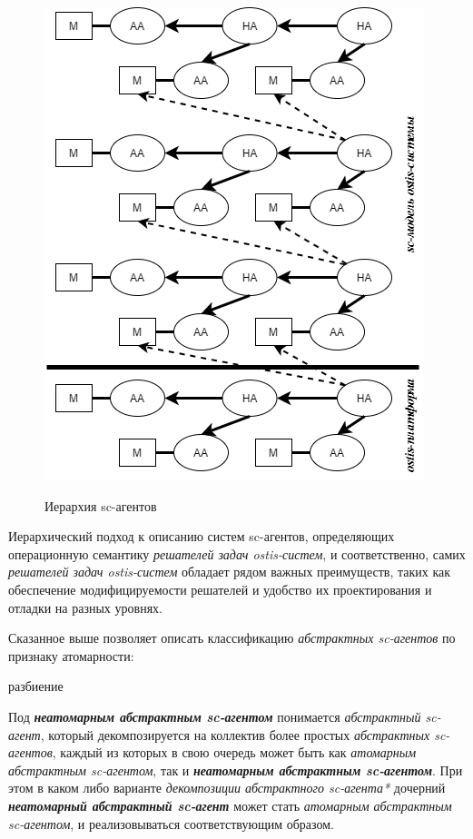 \begin{figure}[H]
	\caption{Иерархия sc-агентов}
	\includegraphics[scale=0.7]{images/part3/chapter_situation_management/agents-hierarchy.png}
	\label{fig:agents-hierarchy}
\end{figure}

Иерархический подход к описанию систем sc-агентов, определяющих операционную семантику \textit{решателей задач ostis-систем}, и соответственно, самих \textit{решателей задач ostis-систем} обладает рядом важных преимуществ, таких как обеспечение модифицируемости решателей и удобство их проектирования и отладки на разных уровнях.

Сказанное выше позволяет описать классификацию \textit{абстрактных sc-агентов} по признаку атомарности:

\begin{SCn}
	\begin{scnrelfromset}{разбиение}
	\end{scnrelfromset}
\end{SCn}

Под \textbf{\textit{неатомарным абстрактным sc-агентом}} понимается \textit{абстрактный sc-агент}, который декомпозируется на коллектив более простых \textit{абстрактных sc-агентов}, каждый из которых в свою очередь может быть как \textit{атомарным абстрактным sc-агентом}, так и \textbf{\textit{неатомарным абстрактным sc-агентом}}. При этом в каком либо варианте \textit{декомпозиции абстрактного sc-агента*} дочерний \textbf{\textit{неатомарный абстрактный sc-агент}} может стать \textit{атомарным абстрактным sc-агентом}, и реализовываться соответствующим образом.

